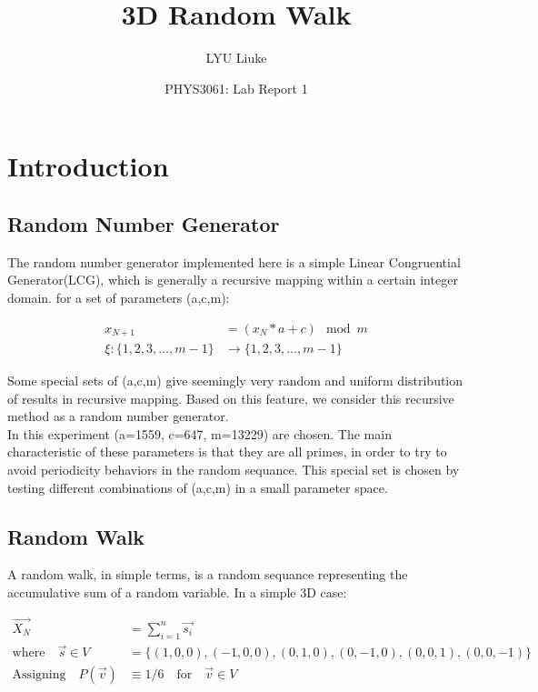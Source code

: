 \documentclass{article}
\title{3D Random Walk}
\author{LYU Liuke}
\date{PHYS3061: Lab Report 1}
\begin{document}
\maketitle
\tableofcontents
\clearpage

\section{Introduction}

\subsection{Random Number Generator}

The random number generator implemented here is a simple Linear Congruential
Generator(LCG), which is generally a recursive mapping within a certain integer
domain. for a set of parameters (a,c,m):

\begin{align*}
  x_{N+1} &= (x_N * a + c) \mod m \\
  \xi \colon \{1,2,3,\dots,m-1\} &\to \{1,2,3,\dots,m-1\}
\end{align*}

Some special sets of (a,c,m) give seemingly very random and uniform distribution
of results in recursive mapping. Based on this feature, we consider this recursive 
method as a random number generator. \\

In this experiment (a=1559, c=647, m=13229) are chosen. 
The main characteristic of these parameters is that they are all primes, in order
to try to avoid periodicity behaviors in the random sequance.
This special set is chosen by testing different combinations of (a,c,m) in a
small parameter space.

\subsection{Random Walk}
  
A random walk, in simple terms, is a random sequance representing the 
accumulative sum of a random variable. In a simple 3D case:

\begin{align*}
  \vec{X_N} &= \sum_{i=1}^{n} \vec{s_i} \\
  \mbox{where} \quad  \vec{s} \in V &= \{(1,0,0), (-1,0,0), (0,1,0), (0,-1,0), (0,0,1),(0,0,-1)\} \\
  \mbox{Assigning} \quad P(\vec{v}) &\equiv 1/6 \quad \mbox{for}  \quad \vec{v} \in V
\end{align*}
\end{document}
